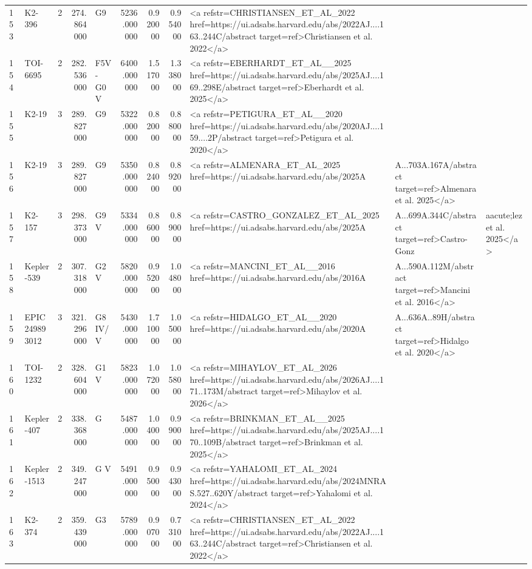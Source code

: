 \begin{tabular}{llrrlrrrl}
153 & K2-396 & 2 & 274.864000 & G9 & 5236.000000 & 0.920000 & 0.954000 & <a refstr=CHRISTIANSEN_ET_AL_2022 href=https://ui.adsabs.harvard.edu/abs/2022AJ....163..244C/abstract target=ref>Christiansen et al. 2022</a> \\
154 & TOI-6695 & 2 & 282.536000 & F5V-G0V & 6400.000000 & 1.517000 & 1.338000 & <a refstr=EBERHARDT_ET_AL__2025 href=https://ui.adsabs.harvard.edu/abs/2025AJ....169..298E/abstract target=ref>Eberhardt et al. 2025</a> \\
155 & K2-19 & 3 & 289.827000 & G9 & 5322.000000 & 0.820000 & 0.880000 & <a refstr=PETIGURA_ET_AL__2020 href=https://ui.adsabs.harvard.edu/abs/2020AJ....159....2P/abstract target=ref>Petigura et al. 2020</a> \\
156 & K2-19 & 3 & 289.827000 & G9 & 5350.000000 & 0.824000 & 0.892000 & <a refstr=ALMENARA_ET_AL_2025 href=https://ui.adsabs.harvard.edu/abs/2025A&A...703A.167A/abstract target=ref>Almenara et al. 2025</a> \\
157 & K2-157 & 3 & 298.373000 & G9 V & 5334.000000 & 0.860000 & 0.890000 & <a refstr=CASTRO_GONZALEZ_ET_AL_2025 href=https://ui.adsabs.harvard.edu/abs/2025A&A...699A.344C/abstract target=ref>Castro-Gonz&aacute;lez et al. 2025</a> \\
158 & Kepler-539 & 2 & 307.318000 & G2 V & 5820.000000 & 0.952000 & 1.048000 & <a refstr=MANCINI_ET_AL__2016 href=https://ui.adsabs.harvard.edu/abs/2016A&A...590A.112M/abstract target=ref>Mancini et al. 2016</a> \\
159 & EPIC 249893012 & 3 & 321.296000 & G8 IV/V & 5430.000000 & 1.710000 & 1.050000 & <a refstr=HIDALGO_ET_AL__2020 href=https://ui.adsabs.harvard.edu/abs/2020A&A...636A..89H/abstract target=ref>Hidalgo et al. 2020</a> \\
160 & TOI-1232 & 2 & 328.604000 & G1 V & 5823.000000 & 1.072000 & 1.058000 & <a refstr=MIHAYLOV_ET_AL_2026 href=https://ui.adsabs.harvard.edu/abs/2026AJ....171..173M/abstract target=ref>Mihaylov et al. 2026</a> \\
161 & Kepler-407 & 2 & 338.368000 & G & 5487.000000 & 1.040000 & 0.990000 & <a refstr=BRINKMAN_ET_AL__2025 href=https://ui.adsabs.harvard.edu/abs/2025AJ....170..109B/abstract target=ref>Brinkman et al. 2025</a> \\
162 & Kepler-1513 & 2 & 349.247000 & G V & 5491.000000 & 0.950000 & 0.943000 & <a refstr=YAHALOMI_ET_AL_2024 href=https://ui.adsabs.harvard.edu/abs/2024MNRAS.527..620Y/abstract target=ref>Yahalomi et al. 2024</a> \\
163 & K2-374 & 2 & 359.439000 & G3 & 5789.000000 & 0.907000 & 0.731000 & <a refstr=CHRISTIANSEN_ET_AL_2022 href=https://ui.adsabs.harvard.edu/abs/2022AJ....163..244C/abstract target=ref>Christiansen et al. 2022</a> \\

\end{tabular}
